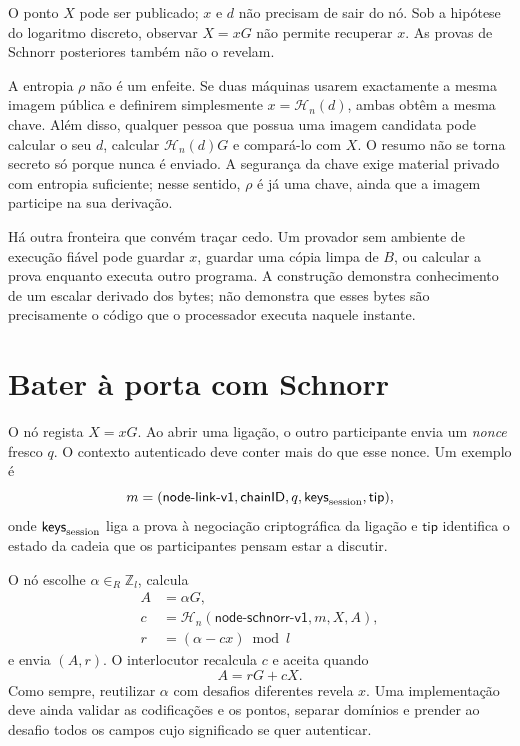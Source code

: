 O ponto \(X\) pode ser publicado; \(x\) e \(d\) não precisam de sair do nó. Sob
a hipótese do logaritmo discreto, observar \(X=xG\) não permite recuperar
\(x\). As provas de Schnorr posteriores também não o revelam.

A entropia \(\rho\) não é um enfeite. Se duas máquinas usarem exactamente a
mesma imagem pública e definirem simplesmente \(x=\mathcal H_n(d)\), ambas obtêm
a mesma chave. Além disso, qualquer pessoa que possua uma imagem candidata pode
calcular o seu \(d\), calcular \(\mathcal H_n(d)G\) e compará-lo com \(X\). O
resumo não se torna secreto só porque nunca é enviado. A segurança da chave
exige material privado com entropia suficiente; nesse sentido, \(\rho\) é já uma
chave, ainda que a imagem participe na sua derivação.

Há outra fronteira que convém traçar cedo. Um provador sem ambiente de execução
fiável pode guardar \(x\), guardar uma cópia limpa de \(B\), ou calcular a prova
enquanto executa outro programa. A construção demonstra conhecimento de um
escalar derivado dos bytes; não demonstra que esses bytes são precisamente o
código que o processador executa naquele instante.

\section{Bater à porta com Schnorr}

O nó regista \(X=xG\). Ao abrir uma ligação, o outro participante envia um
\emph{nonce} fresco \(q\). O contexto autenticado deve conter mais do que esse
nonce. Um exemplo é
\[
 m=(\mathsf{node\mbox{-}link\mbox{-}v1},\mathsf{chainID},q,
       \mathsf{keys}_{\rm session},\mathsf{tip}),
\]
onde \(\mathsf{keys}_{\rm session}\) liga a prova à negociação criptográfica da
ligação e \(\mathsf{tip}\) identifica o estado da cadeia que os participantes
pensam estar a discutir.

O nó escolhe \(\alpha\in_R\mathbb Z_l\), calcula
\begin{align*}
    A&=\alpha G,\\
    c&=\mathcal H_n(\mathsf{node\mbox{-}schnorr\mbox{-}v1},m,X,A),\\
    r&=(\alpha-cx)\bmod l
\end{align*}
e envia \((A,r)\). O interlocutor recalcula \(c\) e aceita quando
\[
    A=rG+cX.
\]
Como sempre, reutilizar \(\alpha\) com desafios diferentes revela \(x\). Uma
implementação deve ainda validar as codificações e os pontos, separar domínios
e prender ao desafio todos os campos cujo significado se quer autenticar.

